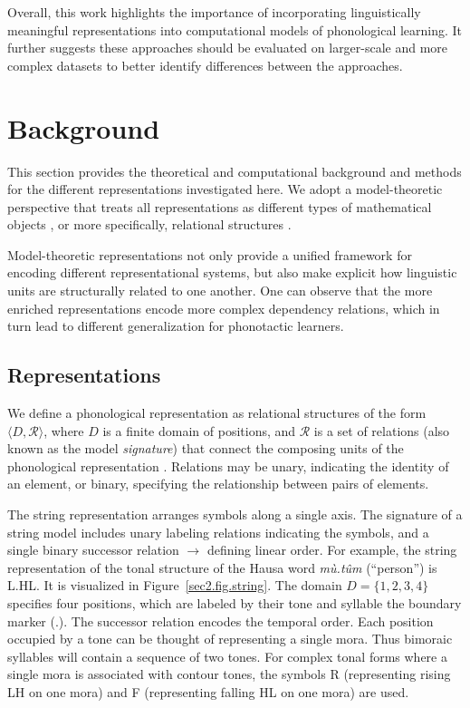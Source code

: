 Overall, this work highlights the importance of incorporating
linguistically meaningful representations into computational models of
phonological learning. It further suggests these approaches should be
evaluated on larger-scale and more complex datasets to better identify
differences between the approaches.

\section{Background}
\label{sec:background}

This section provides the theoretical and computational background and
methods for the different representations investigated here.
We adopt a model-theoretic perspective that treats all representations as
different types of mathematical objects \citep{enderton2001mathematical}, or
more specifically, relational structures
\citep{rogers2013,chandleeBufia2019,rogers.lambert2019mol}.


Model-theoretic representations not only provide a unified framework 
for encoding different representational systems, but also make explicit 
how linguistic units are structurally related to one another. 
One can observe that the more enriched representations 
encode more complex dependency relations, which in turn lead to 
different generalization for phonotactic learners.


\subsection{Representations}

We define a phonological representation as relational structures of the
form $\langle D, \mathcal{R} \rangle$, where $D$ is a finite domain of
positions, and $\mathcal{R}$ is a set of relations (also known as the
model \textit{signature}) that connect the composing units of the
phonological representation \citep{strother2017using, jardine2016locality}.
Relations may be unary, indicating the identity of an element, or binary,
specifying the relationship between pairs of elements.

The string representation arranges symbols along a single axis.
The signature of a string model includes unary labeling relations indicating
the symbols, and a single binary successor relation $\rightarrow$ defining linear
order.
For example, the string representation of the tonal structure of the Hausa word
\textit{mù.tûm} (``person'') is L.HL.
It is visualized in Figure~\ref{sec2.fig.string}.
The domain  $D=\{1,2,3,4\}$ specifies four positions,
which are labeled by their tone and syllable the boundary marker (.).
The successor relation encodes the temporal order.
Each position occupied by a tone can be thought of representing a single mora.
Thus bimoraic syllables will contain a sequence of two tones.
For complex tonal forms where a single mora is associated with contour tones,
the symbols R (representing rising LH on one mora)
and F (representing falling HL on one mora) are used.

